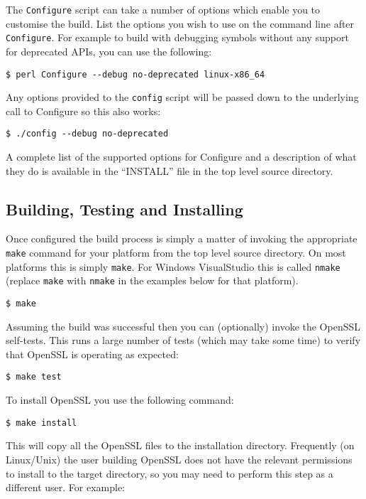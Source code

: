 The \verb!Configure! script can take a number of options which enable you to
customise the build. List the options you wish to use on the command line after
\verb!Configure!. For example to build with debugging symbols without any support
for deprecated APIs, you can use the following:

\begin{verbatim}
$ perl Configure --debug no-deprecated linux-x86_64
\end{verbatim}

Any options provided to the \verb!config! script will be passed down to the underlying
call to Configure so this also works:

\begin{verbatim}
$ ./config --debug no-deprecated
\end{verbatim}

A complete list of the supported options for Configure and a description of what
they do is available in the ``INSTALL'' file in the top level source directory.

\subsection{Building, Testing and Installing}

Once configured the build process is simply a matter of invoking the appropriate
\verb!make! command for your platform from the top level source directory. On most
platforms this is simply \verb!make!. For Windows VisualStudio this is called
\verb!nmake! (replace \verb!make! with \verb!nmake! in the examples below for that
platform).

\begin{verbatim}
$ make
\end{verbatim}

Assuming the build was successful then you can (optionally) invoke the OpenSSL
self-tests. This runs a large number of tests (which may take some time) to
verify that OpenSSL is operating as expected:

\begin{verbatim}
$ make test
\end{verbatim}

To install OpenSSL you use the following command:

\begin{verbatim}
$ make install
\end{verbatim}

This will copy all the OpenSSL files to the installation directory. Frequently
(on Linux/Unix) the user building OpenSSL does not have the relevant permissions
to install to the target directory, so you may need to perform this step as a
different user. For example:

